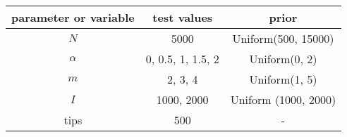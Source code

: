 \begin{tabular}{ccc}
  parameter or variable & test values & prior \\
  \hline
  $N$ & 5000 & Uniform(500, 15000) \\
  $\alpha$ & 0, 0.5, 1, 1.5, 2 & Uniform(0, 2) \\
  $m$ & 2, 3, 4 & Uniform(1, 5) \\
  $I$ & 1000, 2000 & Uniform (1000, 2000) \\
  tips & 500 & - \\
  \hline
\end{tabular}

